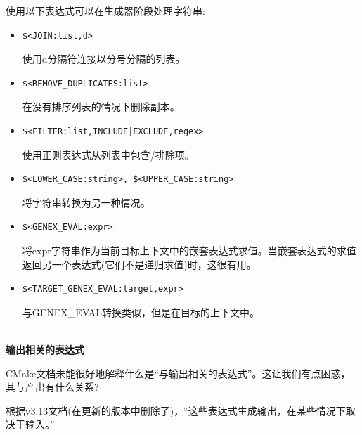使用以下表达式可以在生成器阶段处理字符串:

\begin{itemize}
\item 
\begin{lstlisting}[style=styleCMake]
$<JOIN:list,d> 
\end{lstlisting}

使用d分隔符连接以分号分隔的列表。

\item 
\begin{lstlisting}[style=styleCMake]
$<REMOVE_DUPLICATES:list>
\end{lstlisting}

在没有排序列表的情况下删除副本。

\item 
\begin{lstlisting}[style=styleCMake]
$<FILTER:list,INCLUDE|EXCLUDE,regex>
\end{lstlisting}

使用正则表达式从列表中包含/排除项。

\item 
\begin{lstlisting}[style=styleCMake]
$<LOWER_CASE:string>, $<UPPER_CASE:string>
\end{lstlisting}

将字符串转换为另一种情况。

\item 
\begin{lstlisting}[style=styleCMake]
$<GENEX_EVAL:expr>
\end{lstlisting}

将expr字符串作为当前目标上下文中的嵌套表达式求值。当嵌套表达式的求值返回另一个表达式(它们不是递归求值)时，这很有用。

\item 
\begin{lstlisting}[style=styleCMake]
$<TARGET_GENEX_EVAL:target,expr>
\end{lstlisting}

与GENEX\_EVAL转换类似，但是在目标的上下文中。
\end{itemize}

\hspace*{\fill} \\ %
\noindent
\textbf{输出相关的表达式}

CMake文档未能很好地解释什么是“与输出相关的表达式”。这让我们有点困惑，其与产出有什么关系?

根据v3.13文档(在更新的版本中删除了)，“这些表达式生成输出，在某些情况下取决于输入。” 

